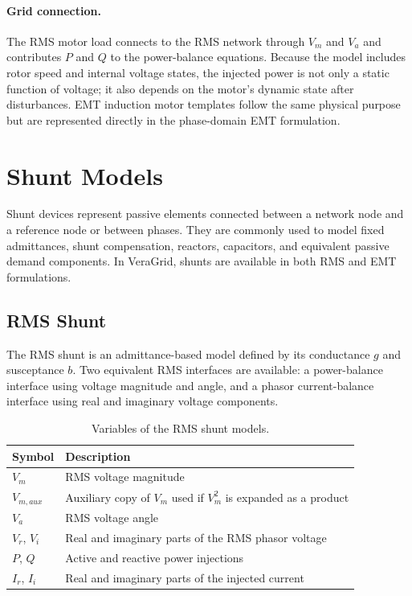 \paragraph{Grid connection.}
The RMS motor load connects to the RMS network through $V_m$ and $V_a$ and contributes $P$ and $Q$ to the power-balance equations. Because the model includes rotor speed and internal voltage states, the injected power is not only a static function of voltage; it also depends on the motor's dynamic state after disturbances. EMT induction motor templates follow the same physical purpose but are represented directly in the phase-domain EMT formulation.

\section{Shunt Models}

Shunt devices represent passive elements connected between a network node and a reference node or between phases. They are commonly used to model fixed admittances, shunt compensation, reactors, capacitors, and equivalent passive demand components. In VeraGrid, shunts are available in both RMS and EMT formulations.

\subsection{RMS Shunt}

The RMS shunt is an admittance-based model defined by its conductance $g$ and susceptance $b$. Two equivalent RMS interfaces are available: a power-balance interface using voltage magnitude and angle, and a phasor current-balance interface using real and imaginary voltage components.

\begin{table}[H]
    \centering
    \caption{Variables of the RMS shunt models.}
    \begin{tabular}{ll}
        \toprule
        Symbol & Description \\
        \midrule
        $V_m$ & RMS voltage magnitude \\
        $V_{m,aux}$ & Auxiliary copy of $V_m$ used if $V_m^2$ is expanded as a product \\
        $V_a$ & RMS voltage angle \\
        $V_r$, $V_i$ & Real and imaginary parts of the RMS phasor voltage \\
        $P$, $Q$ & Active and reactive power injections \\
        $I_r$, $I_i$ & Real and imaginary parts of the injected current \\
        \bottomrule
    \end{tabular}
\end{table}

